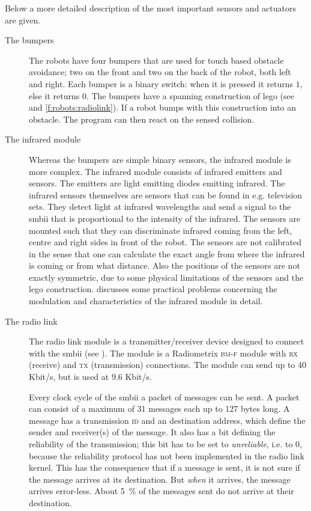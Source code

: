 Below a more detailed description of the most important sensors and actuators are given. 


\begin{description}
\item[The bumpers] The robots have four bumpers that are used for touch based obstacle avoidance; two on the front and two on the back of the robot, both left and right. Each bumper is a binary switch: when it is pressed it returns $1$, else it returns $0$. The bumpers have a spanning construction of {\sc lego} (see  and \ref{f:robots:radiolink}). If a robot bumps with this construction into an obstacle. The program can then react on the sensed collision.
\item[The infrared module] Whereas the bumpers are simple binary sensors, the infrared module  is more complex. The infrared module consists of infrared emitters and sensors. The emitters are light emitting diodes emitting infrared. The infrared sensors themselves are sensors that can be found in e.g. television sets. They detect light at infrared wavelengths and send a signal to the {\sc smbii} that is proportional to the intensity of the infrared. The sensors are mounted such that they can discriminate infrared coming from the left, centre and right sides in front of the robot. The sensors are not calibrated in the sense that one can calculate the exact angle from where the infrared is coming or from what distance. Also the  positions of the sensors are not exactly symmetric, due to some physical limitations of the sensors and the {\sc lego} construction. \citet{vogt:1997} discusses some practical problems concerning the modulation and characteristics of the infrared module in detail.

\item[The radio link] The radio link module is a transmitter/receiver device designed to connect with the {\sc smbii} (see ). The module is a Radiometrix {\scshape bm}-{}{\scshape f} module with {\scshape rx} (receive) and {\scshape tx} (transmission) connections. The module can send up to 40 Kbit/s, but is used at 9.6 Kbit/s. 

Every clock cycle of the {\sc smbii} a packet of messages can be sent. A packet can consist of a maximum of 31 messages each up to 127 bytes long. A message has a transmission {\scshape id} and an destination address, which define the sender and receiver(s) of the message.  It also has a bit defining the reliability of the transmission; this bit has to be set to {\it unreliable}, i.e. to $0$, because the reliability protocol has not been implemented in the radio link kernel. This has the consequence that if a message is sent, it is not sure if the message arrives at its destination. But {\em when} it arrives, the message arrives error-less. About 5~\% of the messages sent do not arrive at their destination.


\end{description}
